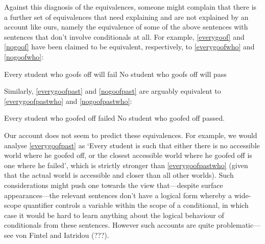 \documentclass[leqno, 11pt, a5paper, openany]{article}
\begin{document}
Against this diagnosis of the equivalences, someone might complain that there is a further set of equivalences that need explaining and are not explained by an account like ours, namely the equivalence of some of the above sentences with sentences that don't involve conditionals at all. For example, \ref{everygoof} and \ref{nogoof} have been claimed to be equivalent, respectively, to \ref{everygoofwho} and \ref{nogoofwho}:
\begin{prop}
	\nitem \label{everygoofwho}
	Every student who goofs off will fail
	\nitem \label{nogoofwho}
	No student who goofs off will pass
	\end{prop}
Similarly, \ref{everygoofpast} and \ref{nogoofpast} are arguably equivalent to \ref{everygoofpastwho} and \ref{nogoofpastwho}:
\begin{prop}
	\nitem \label{everygoofpastwho}
	Every student who goofed off failed
	\nitem \label{nogoofpastwho}
	No student who goofed off passed.
\end{prop}
Our account does not seem to predict these equivalences. For example, we would analyse \ref{everygoofpast} as ‘Every student is such that either there is no accessible world where he goofed off, or the closest accessible world where he goofed off is one where he failed’, which is strictly stronger than \ref{everygoofpastwho} (given that the actual world is accessible and closer than all other worlds). Such considerations might push one towards the view that---despite surface appearances---the relevant sentences don't have a logical form whereby a wide-scope quantifier controls a variable within the scope of a conditional, in which case it would be hard to learn anything about the logical behaviour of conditionals from these sentences. However such accounts are quite problematic---see von Fintel and Iatridou (???).
\end{document}
